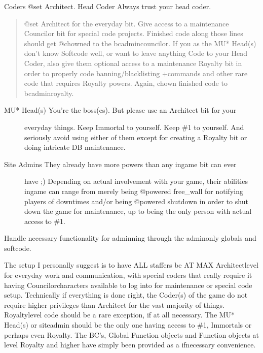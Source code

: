 \documentclass[letterpaper,10pt,english]{sphinxmanual}
\begin{document}
\sphinxAtStartPar
Coders        \sphinxhyphen{} @set Architect.
Head Coder    \sphinxhyphen{} Always trust your head coder.
\begin{quote}

\sphinxAtStartPar
@set Architect for the everyday bit. Give access to a
maintenance Councilor bit for special code projects. Finished
code along those lines should get @chowned to the
bc\sphinxhyphen{}admin\sphinxhyphen{}councilor.
If you as the MU* Head(s) don’t know Softcode well, or want to
leave anything Code to your Head Coder, also give them optional
access to a maintenance Royalty bit in order to properly code
banning/blacklisting +commands and other rare code that requires
Royalty powers. Again, chown finished code to bc\sphinxhyphen{}admin\sphinxhyphen{}royalty.
\end{quote}
\begin{description}
\item[{MU* Head(s)   \sphinxhyphen{} You’re the boss(es). But please use an Architect bit for your}] \leavevmode
\sphinxAtStartPar
everyday things. Keep Immortal to yourself. Keep \#1 to yourself.
And seriously avoid using either of them except for creating
a Royalty bit or doing intricate DB maintenance.

\item[{Site Admins   \sphinxhyphen{} They already have more powers than any in\sphinxhyphen{}game bit can ever}] \leavevmode
\sphinxAtStartPar
have ;)
Depending on actual involvement with your game, their abilities
in\sphinxhyphen{}game can range from merely being @powered free\_wall for
notifying players of downtimes and/or being @powered shutdown in
order to shut down the game for maintenance, up to being the
only person with actual access to \#1.

\end{description}

\sphinxAtStartPar
Handle necessary functionality for adminning through the admin\sphinxhyphen{}only globals and
softcode.

\sphinxAtStartPar
The setup I personally suggest is to have ALL staffers be AT MAX Architect\sphinxhyphen{}level
for everyday work and communication, with special coders that \sphinxhyphen{}really\sphinxhyphen{} require
it having Councilor\sphinxhyphen{}characters available to log into for maintenance or special
code setup. Technically if everything is done right, the Coder(s) of the game do
not require higher privileges than Architect for the vast majority of things.
Royalty\sphinxhyphen{}level code should be a rare exception, if at all necessary. The MU*
Head(s) or site\sphinxhyphen{}admin should be the only one having access to \#1, Immortals or
perhaps even Royalty. The BC’s, Global Function objects and Function objects at
level Royalty and higher have simply been provided as a if\sphinxhyphen{}necessary convenience.
\end{document}
